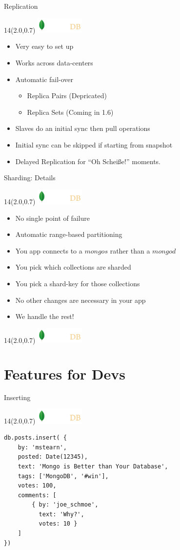 \documentclass{beamer}
\newcommand{\MongoLogo}{
\begin{textblock}{14}(2.0,0.7)
  \includegraphics[height=0.8cm]{logo-mongodb-ondark.png}
\end{textblock}
}
\begin{document}
\begin{frame}[fragile]{Replication}
  \MongoLogo

  \begin{itemize}
      \item Very easy to set up
      \item Works across data-centers
      \item Automatic fail-over
        \begin{itemize}
          \item Replica Pairs (Depricated)
          \item Replica Sets (Coming in 1.6)
        \end{itemize}
      \item Slaves do an initial sync then pull operations
      \item Initial sync can be skipped if starting from snapshot
      \item Delayed Replication for ``Oh Schei\ss{}e!'' moments.
  \end{itemize}
\end{frame}


\begin{frame}[fragile]{Sharding: Details}
  \MongoLogo
  \begin{itemize}
    \item No single point of failure
    \item Automatic range-based partitioning
    \item You app connects to a $mongos$ rather than a $mongod$
    \item You pick which collections are sharded
    \item You pick a shard-key for those collections
    \item No other changes are necessary in your app
    \item We handle the rest!
  \end{itemize}
\end{frame}

\begin{frame}
  \MongoLogo
  \center
\end{frame}

\section{Features for Devs}

\begin{frame}[fragile]{Inserting}
  \MongoLogo

\begin{lstlisting}
db.posts.insert( {
    by: 'mstearn',
    posted: Date(12345),
    text: 'Mongo is Better than Your Database',
    tags: ['MongoDB', '#win'],
    votes: 100,
    comments: [
        { by: 'joe_schmoe',
          text: 'Why?',
          votes: 10 }
    ]
})
\end{lstlisting}
\end{frame}
\end{document}
